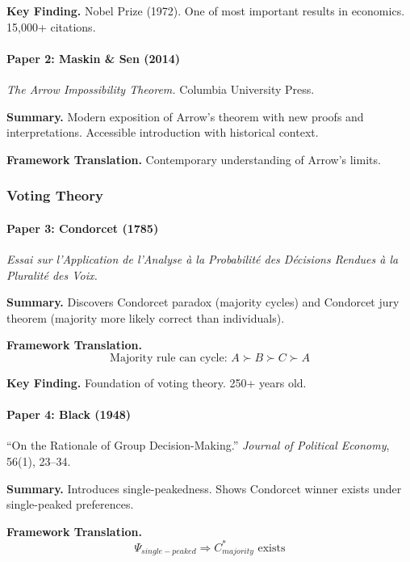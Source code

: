 \textbf{Key Finding.}
Nobel Prize (1972). One of most important results in economics. 15,000+ citations.

\paragraph{Paper 2: Maskin \& Sen (2014)}

\textit{The Arrow Impossibility Theorem.}
Columbia University Press.

\textbf{Summary.}
Modern exposition of Arrow's theorem with new proofs and interpretations.
Accessible introduction with historical context.

\textbf{Framework Translation.}
Contemporary understanding of Arrow's limits.

\subsubsection{Voting Theory}

\paragraph{Paper 3: Condorcet (1785)}

\textit{Essai sur l'Application de l'Analyse à la Probabilité des Décisions 
Rendues à la Pluralité des Voix.}

\textbf{Summary.}
Discovers Condorcet paradox (majority cycles) and Condorcet jury theorem 
(majority more likely correct than individuals).

\textbf{Framework Translation.}
\begin{equation}
\text{Majority rule can cycle: } A \succ B \succ C \succ A
\end{equation}

\textbf{Key Finding.}
Foundation of voting theory. 250+ years old.

\paragraph{Paper 4: Black (1948)}

``On the Rationale of Group Decision-Making.''
\textit{Journal of Political Economy}, 56(1), 23--34.

\textbf{Summary.}
Introduces single-peakedness. Shows Condorcet winner exists under 
single-peaked preferences.

\textbf{Framework Translation.}
\begin{equation}
\Psi_{single-peaked} \Rightarrow C^*_{majority} \text{ exists}
\end{equation}

